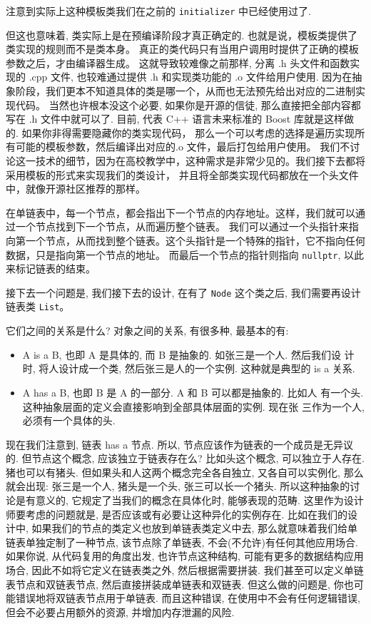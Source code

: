 \documentclass[a4paper]{ctexart}
\theoremstyle{definition}
\theoremstyle{definition}
\begin{document}
注意到实际上这种模板类我们在之前的 \verb|initializer| 中已经使用过了.

但这也意味着, 类实际上是在预编译阶段才真正确定的. 也就是说，模板类提供了类实现的规则而不是类本身。
真正的类代码只有当用户调用时提供了正确的模板参数之后，才由编译器生成。
这就导致较难像之前那样, 分离 .h 头文件和函数实现的 .cpp 文件, 也较难通过提供 .h 和实现类功能的
.o 文件给用户使用. 因为在抽象阶段，我们更本不知道具体的类是哪一个，从而也无法预先给出对应的二进制实现代码。
当然也许根本没这个必要, 如果你是开源的信徒, 那么直接把全部内容都写在 .h 文件中就可以了. 
目前, 代表 C++ 语言未来标准的 Boost 库就是这样做的. 如果你非得需要隐藏你的类实现代码，
那么一个可以考虑的选择是遍历实现所有可能的模板参数，然后编译出对应的.o 文件，最后打包给用户使用。
我们不讨论这一技术的细节，因为在高校教学中，这种需求是非常少见的。我们接下去都将采用模板的形式来实现我们的类设计，
并且将全部类实现代码都放在一个头文件中，就像开源社区推荐的那样。

在单链表中，每一个节点，都会指出下一个节点的内存地址。这样，我们就可以通过一个节点找到下一个节点，从而遍历整个链表。
我们可以通过一个头指针来指向第一个节点，从而找到整个链表。这个头指针是一个特殊的指针，它不指向任何数据，只是指向第一个节点的地址。
而最后一个节点的指针则指向 \verb|nullptr|, 以此来标记链表的结束。

接下去一个问题是, 我们接下去的设计, 在有了 \verb|Node| 这个类之后,
我们需要再设计链表类 \verb|List|。

它们之间的关系是什么? 对象之间的关系, 有很多种, 最基本的有:
\begin{itemize}
  \item A is a B, 也即 A 是具体的, 而 B 是抽象的. 如张三是一个人. 然后我们设
  计时, 将人设计成一个类, 然后张三是人的一个实例. 这种就是典型的 is a 关系.
  \item A has a B, 也即 B 是 A 的一部分. A 和 B 可以都是抽象的. 比如人
    有一个头. 这种抽象层面的定义会直接影响到全部具体层面的实例. 现在张
    三作为一个人, 必须有一个具体的头. 
\end{itemize}

现在我们注意到, 链表 has a 节点. 所以, 节点应该作为链表的一个成员是无异议的. 
但节点这个概念, 应该独立于链表存在么? 比如头这个概念, 可以独立于人存在. 
猪也可以有猪头. 但如果头和人这两个概念完全各自独立, 又各自可以实例化, 
那么就会出现: 张三是一个人, 猪头是一个头, 张三可以长一个猪头.
所以这种抽象的讨论是有意义的, 它规定了当我们的概念在具体化时, 能够表现的范畴. 
这里作为设计师要考虑的问题就是, 是否应该或有必要让这种异化的实例存在. 
比如在我们的设计中, 如果我们的节点的类定义也放到单链表类定义中去, 
那么就意味着我们给单链表单独定制了一种节点, 该节点除了单链表, 不会(不允许)有任何其他应用场合. 
如果你说, 从代码复用的角度出发, 也许节点这种结构, 可能有更多的数据结构应用场合, 
因此不如将它定义在链表类之外, 然后根据需要拼装. 我们甚至可以定义单链表节点和双链表节点, 
然后直接拼装成单链表和双链表. 但这么做的问题是, 你也可能错误地将双链表节点用于单链表.
而且这种错误, 在使用中不会有任何逻辑错误, 但会不必要占用额外的资源, 
并增加内存泄漏的风险. 
\end{document}
